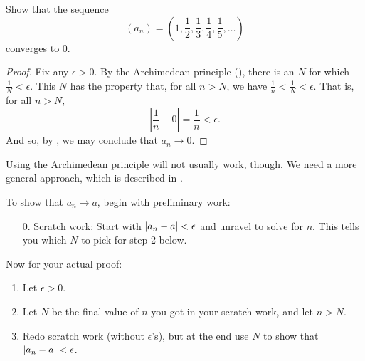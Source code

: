 \begin{example}
  Show that the sequence
  \[ (a_n) = \left(1, \frac{1}{2}, \frac{1}{3}, \frac{1}{4},
  \frac{1}{5}, \dots\right) \]
  converges to 0.

  \begin{proof}
    Fix any $\epsilon > 0$. By the Archimedean principle
    (), there is an $N$ for which
    $\frac{1}{N} < \epsilon$. This $N$ has the property
    that, for all $n > N$, we have $\frac{1}{n} < \frac{1}{N} <
    \epsilon$. That is, for all $n > N$,
    \[ \left|\frac{1}{n} - 0\right| = \frac{1}{n} < \epsilon. \]
    And so, by , we may conclude that
    $a_n \to 0$.
  \end{proof}
\end{example}

\begin{remark}
  Using the Archimedean principle will not usually work, though. We
  need a more general approach, which is described in
  .
\end{remark}

\begin{outline}
  To show that $a_n \to a$, begin with preliminary work:
  \begin{enumerate}
    \item[0.] Scratch work: Start with $| a_n - a | < \epsilon$ and
      unravel to solve for $n$. This tells you which $N$ to pick for
      step 2 below.
  \end{enumerate}
  Now for your actual proof:
  \begin{enumerate}
    \item Let $\epsilon > 0$.
    \item Let $N$ be the final value of $n$ you got in your scratch
      work, and let $n > N$.
    \item Redo scratch work (without $\epsilon$'s), but at the end
      use $N$ to show that $| a_n - a | < \epsilon$.
  \end{enumerate}
\end{outline}

